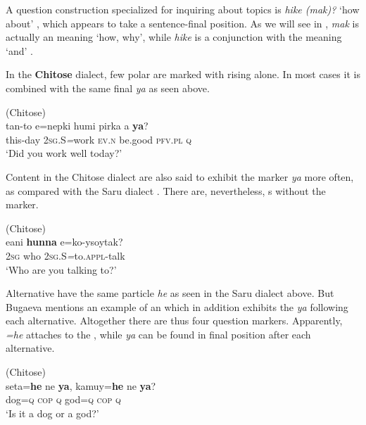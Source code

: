 A question construction specialized for inquiring about topics is \textit{hike (mak)?} ‘how about’ \citep[237]{Tamura2000}, which appears to take a sentence-final position. As we will see in , \textit{mak} is actually an  meaning ‘how, why’, while \textit{hike} is a conjunction with the meaning ‘and’ \citep[497]{Bugaeva2012}.

In the \textbf{Chitose} dialect, few polar  are marked with rising  alone. In most cases it is combined with the same final  \textit{ya} as seen above.

\ea%
    \label{ex:ainu:13}
     (Chitose)\\
    \gll tan-to    e=nepki  humi  pirka    a \textbf{{ya}}?\\
    this-day  2\textsc{sg}.S\textit{=}work  \textsc{ev.n}  be.good  \textsc{pfv.pl}  \textsc{q}\\
    \glt ‘Did you work well today?’ \citep[85]{Bugaeva2004}
    \z

\noindent Content  in the Chitose dialect are also said to exhibit the marker \textit{ya} more often, as compared with the Saru dialect \citep[86]{Bugaeva2004}. There are, nevertheless, s without the marker.

\ea%
    \label{ex:ainu:14}
     (Chitose)\\
    \gll eani \textbf{{hunna}} e=ko-ysoytak?\\
    2\textsc{sg}  who    2\textsc{sg}.S\textit{=}to.\textsc{appl}-talk\\
    \glt ‘Who are you talking to?’ \citep[86]{Bugaeva2004}
    \z

Alternative  have the same particle \textit{he} as seen in the Saru dialect above. But Bugaeva mentions an example of an  which in addition exhibits the  \textit{ya} following each alternative. Altogether there are thus four question markers. Apparently, \textit{=he} attaches to the , while \textit{ya} can be found in final position after each alternative.

\ea%
    \label{ex:ainu:15}
     (Chitose)\\
    \gll seta=\textbf{{he}} ne \textbf{{ya}},  kamuy=\textbf{{he}} ne \textbf{{ya}}?\\
    dog=\textsc{q}    \textsc{cop}  \textsc{q}  god=\textsc{q}    \textsc{cop}  \textsc{q}\\
    \glt ‘Is it a dog or a god?’ \citep[88]{Bugaeva2004} 
    \z

